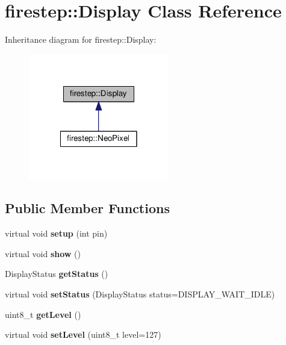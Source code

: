 \hypertarget{classfirestep_1_1_display}{\section{firestep\+:\+:Display Class Reference}
\label{classfirestep_1_1_display}
}


Inheritance diagram for firestep\+:\+:Display\+:\nopagebreak
\begin{figure}[H]
\begin{center}
\leavevmode
\includegraphics[width=174pt]{classfirestep_1_1_display__inherit__graph}
\end{center}
\end{figure}
\subsection*{Public Member Functions}
\begin{DoxyCompactItemize}
\item 
\hypertarget{classfirestep_1_1_display_ac0e86412cc360a40a30eab70b6a134a9}{virtual void {\bfseries setup} (int pin)}\label{classfirestep_1_1_display_ac0e86412cc360a40a30eab70b6a134a9}

\item 
\hypertarget{classfirestep_1_1_display_a53a9f6a1f5b6a9b092d564177ec17941}{virtual void {\bfseries show} ()}\label{classfirestep_1_1_display_a53a9f6a1f5b6a9b092d564177ec17941}

\item 
\hypertarget{classfirestep_1_1_display_a28fa6497250386b2e0d86604182b60cd}{Display\+Status {\bfseries get\+Status} ()}\label{classfirestep_1_1_display_a28fa6497250386b2e0d86604182b60cd}

\item 
\hypertarget{classfirestep_1_1_display_a101c7faf6934812852889a040c6b912f}{virtual void {\bfseries set\+Status} (Display\+Status status=D\+I\+S\+P\+L\+A\+Y\+\_\+\+W\+A\+I\+T\+\_\+\+I\+D\+L\+E)}\label{classfirestep_1_1_display_a101c7faf6934812852889a040c6b912f}

\item 
\hypertarget{classfirestep_1_1_display_a960ee2cf65689f4da354d3e026020a5a}{uint8\+\_\+t {\bfseries get\+Level} ()}\label{classfirestep_1_1_display_a960ee2cf65689f4da354d3e026020a5a}

\item 
\hypertarget{classfirestep_1_1_display_a8e6a6ac174a4d7f459bf177867d90c27}{virtual void {\bfseries set\+Level} (uint8\+\_\+t level=127)}\label{classfirestep_1_1_display_a8e6a6ac174a4d7f459bf177867d90c27}

\end{DoxyCompactItemize}

